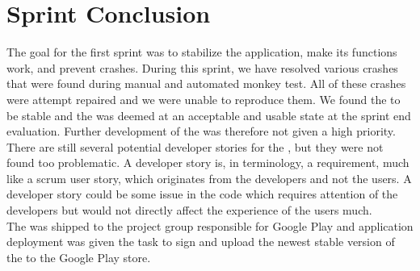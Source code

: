 
\chapter{Sprint Conclusion}
\label{cha:conclusion_sprint_1}

The goal for the first sprint was to stabilize the \launcher application, make its functions work, and prevent crashes. During this sprint, we have resolved various crashes that were found during manual and automated monkey test. All of these crashes were attempt repaired and we were unable to reproduce them. We found the \launcher to be stable and the \launcher was deemed at an acceptable and usable state at the sprint end evaluation. Further development of the \launcher was therefore not given a high priority. \\

There are still several potential developer stories for the \launcher, but they were not found too problematic. A developer story is, in \giraf terminology, a requirement, much like a scrum user story, which originates from the developers and not the users. A developer story could be some issue in the code which requires attention of the developers but would not directly affect the experience of the users much.\\    

The \launcher was shipped to the project group responsible for Google Play and application deployment was given the task to sign and upload the newest stable version of the \launcher to the Google Play store. 






